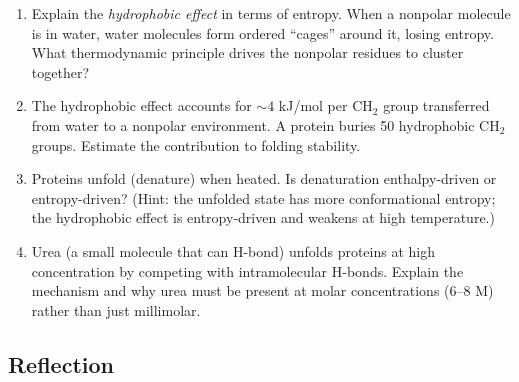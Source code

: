 \documentclass[12pt, a4paper]{book}
\newcommand{\newterm}[1]{\textit{\textcolor{DiscoveryColor}{#1}}}
\begin{document}
\begin{deepbox}
\begin{enumerate}[label=\textbf{D\arabic*.}]
    \begin{enumerate}[label=(\alph*)]
      \item Explain the \newterm{hydrophobic effect} in terms
            of entropy.
            When a nonpolar molecule is in water, water
            molecules form ordered ``cages'' around it,
            losing entropy.
            What thermodynamic principle drives the
            nonpolar residues to cluster together?
      \item The hydrophobic effect accounts for $\sim 4$ kJ/mol
            per CH$_2$ group transferred from water to a
            nonpolar environment.
            A protein buries 50 hydrophobic CH$_2$ groups.
            Estimate the contribution to folding stability.
      \item Proteins unfold (denature) when heated.
            Is denaturation enthalpy-driven or entropy-driven?
            (Hint: the unfolded state has more conformational
            entropy; the hydrophobic effect is entropy-driven
            and weakens at high temperature.)
      \item Urea (a small molecule that can H-bond) unfolds
            proteins at high concentration by competing with
            intramolecular H-bonds.
            Explain the mechanism and why urea must be
            present at molar concentrations (6--8 M) rather
            than just millimolar.
    \end{enumerate}

\end{enumerate}
\end{deepbox}

\subsection*{Reflection}
\end{document}

